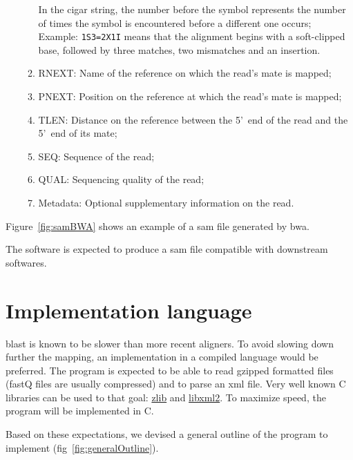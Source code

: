 \begin{itemize}
\begin{enumerate}
        In the \gls{cigar} string, the number before the symbol represents the number of times the symbol is encountered before a different one occurs;
        Example: \texttt{1S3=2X1I} means that the alignment begins with a soft-clipped base, followed by three matches, two mismatches and an insertion.
        \item RNEXT: Name of the reference on which the read's mate is mapped;
        \item PNEXT: Position on the reference at which the read's mate is mapped;
        \item TLEN: Distance on the reference between the 5'~end of the read and the 5'~end of its mate;
        \item SEQ: Sequence of the read;
        \item QUAL: Sequencing quality of the read;
        \item Metadata: Optional supplementary information on the read.
    \end{enumerate}   
\end{itemize}

Figure~\ref{fig:samBWA} shows an example of a \gls{sam} file generated by \gls{bwa}.

The software is expected to produce a \gls{sam} file compatible with downstream softwares.


\section{Implementation language}
\gls{blast} is known to be slower than more recent aligners.
To avoid slowing down further the mapping, an implementation in a compiled language would be preferred.
The program is expected to be able to read gzipped formatted files (fastQ files are usually compressed) and to parse an \gls{xml} file.
Very well known C libraries can be used to that goal: \href{http://www.zlib.net/}{zlib} and \href{http://www.xmlsoft.org/}{libxml2}.
To maximize speed, the program will be implemented in C.

Based on these expectations, we devised a general outline of the program to implement (fig~\ref{fig:generalOutline}).


